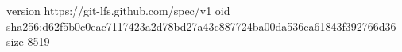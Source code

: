version https://git-lfs.github.com/spec/v1
oid sha256:d62f5b0c0eac7117423a2d78bd27a43c887724ba00da536ca61843f392766d36
size 8519
